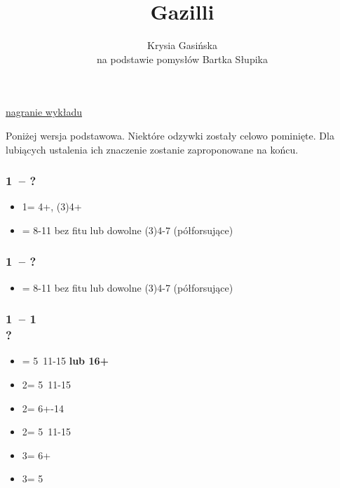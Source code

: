\documentclass[12pt, a4paper]{article}
\title{\fontsize{30pt}{30pt}\selectfont Gazilli}
\author{Krysia Gasińska\\
        \small{na podstawie pomysłów Bartka Słupika}}
\begin{document}
\maketitle

\begin{formal}
\href{https://www.youtube.com/@multi2diamonds}{nagranie wykładu} 
\vspace{0.3cm}
\end{formal}

Poniżej wersja podstawowa. Niektóre odzywki zostały celowo pominięte. Dla lubiących ustalenia ich znaczenie
zostanie zaproponowane na końcu.

\subsubsection*{1\hearts\ -- ?}
\begin{itemize}
    \item 1\spades = 4+\spades, (3)4+ \hcp
    \item \alrts{1\ntx} = 8-11 bez fitu lub dowolne (3)4-7 (półforsujące)
\end{itemize}

\subsubsection*{1\spades\ -- ?}
\begin{itemize}
    \item \alrts{1\ntx} = 8-11 bez fitu lub dowolne (3)4-7 (półforsujące)
\end{itemize}

\subsubsection*{1\hearts\ -- 1\spades\ \\ ?}
\begin{itemize}
    \item \alrts{2\clubs} = 5\clubs\ 11-15 \textbf{lub 16+} \fonce \imp
    \item 2\diams = 5\diams\ 11-15
    \item 2\hearts = 6+-14
    \item 2\spades = 5\spades\ 11-15
    \item 3\hearts = 6+\hearts\ \inv
    \item 3\spades = 5\spades\ \inv
\end{itemize}
\end{document}
